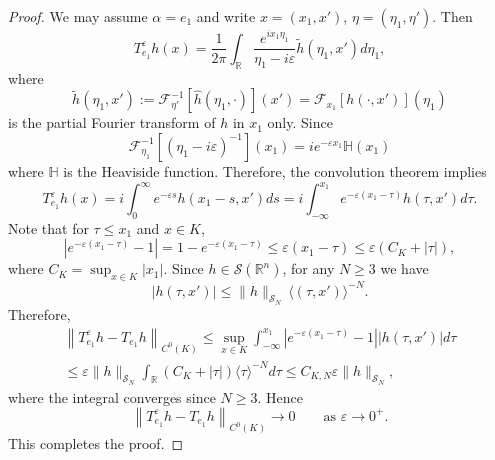 \documentclass[12pt,a4paper]{amsart}
\numberwithin{equation}{section}
\theoremstyle{plain}
\theoremstyle{definition}
\begin{document}
\begin{proof}
We may assume $\alpha=e_1$ and write $x=(x_1,x')$, $\eta=(\eta_1,\eta')$.
Then
\begin{equation*}
    T_{e_1}^\varepsilon h(x)
  = \frac{1}{2\pi}\int_{\mathbb{R}}
    \frac{e^{ix_1\eta_1}}{\eta_1-i\varepsilon}
    \widetilde{h}(\eta_1,x') d\eta_1,
\end{equation*}
where
\begin{equation*}
    \widetilde{h}(\eta_1,x'):=\mathcal{F}_{\eta'}^{-1}[\widehat{h}(\eta_1,\cdot)](x')
=\mathcal{F}_{x_1}[h(\cdot,x')](\eta_1)
\end{equation*}
is the partial Fourier transform of $h$ in $x_1$ only. Since 
\begin{equation*}
    \mathcal{F}^{-1}_{\eta_1}[(\eta_1-i\varepsilon)^{-1}](x_1)
= i e^{-\varepsilon x_1} \mathbb{H}(x_1)
\end{equation*}
where $\mathbb{H}$ is the Heaviside function. Therefore, the convolution theorem implies
\begin{equation}\label{eq:expr_T_epsilon}
    T_{e_1}^\varepsilon h(x)
  = i\int_0^\infty e^{-\varepsilon s} h(x_1-s,x')ds
  = i\int_{-\infty}^{x_1} e^{-\varepsilon(x_1-\tau)} h(\tau,x')d\tau.
\end{equation}
Note that for $\tau \leq x_1$ and $x \in K$,
\begin{equation*}
    \left|e^{-\varepsilon(x_1 - \tau)} - 1\right|
    = 1 - e^{-\varepsilon(x_1 - \tau)}
    \leq
    \varepsilon(x_1 - \tau)
    \leq
    \varepsilon(C_K + |\tau|),
\end{equation*}
where $C_K = \sup_{x \in K} |x_1|$. Since $h \in \mathscr{S}(\mathbb{R}^n)$, for any $N \geq 3$ we have
\begin{equation*}
    |h(\tau, x')| \leq \|h\|_{\mathscr{S}_N}\,
\langle(\tau, x')\rangle^{-N}.
\end{equation*}
Therefore,
\begin{multline*}
    \left\|T_{e_1}^\varepsilon h
    - T_{e_1} h\right\|_{C^0(K)} \leq \sup_{x \in K}  \int_{-\infty}^{x_1} \left|e^{-\varepsilon(x_1-\tau)} - 1\right||h(\tau,x')|d\tau\\
    \leq
    \varepsilon \|h\|_{\mathscr{S}_N}
    \int_{\mathbb{R}}
    (C_K + |\tau|) \langle\tau\rangle^{-N} d\tau
    \leq
    C_{K,N} \varepsilon \|h\|_{\mathscr{S}_N},
\end{multline*}
where the integral converges since $N \geq 3$. Hence
\begin{equation*}
    \left\|T_{e_1}^\varepsilon h
    - T_{e_1} h\right\|_{C^0(K)}
    \to 0
    \qquad \text{as } \varepsilon \to 0^+.
\end{equation*}
This completes the proof.
\end{proof}
\end{document}
